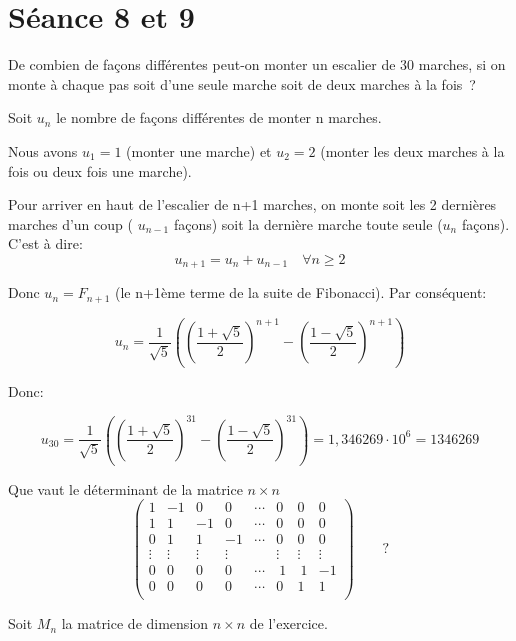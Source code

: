 \section{Séance 8 et 9}

\begin{exo}
De combien de fa\c{c}ons diff\'erentes peut-on monter un escalier de 30 marches, si on monte \`a chaque pas soit d'une seule marche soit de deux marches \`a la fois~?
\end{exo}

Soit $u_n$ le nombre de façons différentes de monter n marches.

Nous avons $u_1 = 1$ (monter une marche) et $u_2 = 2$ (monter les deux marches à la fois ou deux fois une marche).

Pour arriver en haut de l'escalier de n+1 marches, on monte soit les 2 dernières marches d'un coup ( $u_{n-1}$ façons) soit la dernière marche toute seule ($u_n$ façons). C'est à dire: \[u_{n+1} = u_n + u_{n-1} \quad \forall n \geq 2 \]

Donc $u_n = F_{n+1}$ (le n+1ème terme de la suite de Fibonacci). Par conséquent: 

\[
u_n = \frac{1}{\sqrt{5}} \left( (\frac{1+\sqrt{5}}{2})^{n+1} - (\frac{1-\sqrt{5}}{2})^{n+1} \right)
\]

Donc: 

\[
u_{30} = \frac{1}{\sqrt{5}} \left( (\frac{1+\sqrt{5}}{2})^{31} - (\frac{1-\sqrt{5}}{2})^{31} \right) = 1,346269 \cdot 10^6 = 1346269
\]


\begin{exo} 
Que vaut le d\'eterminant de la matrice $n \times n$ 
\[
\left( 
\begin{array}{rrrrrrrr}
1 &-1 &0  &0  &\cdots &0 &0 &0\\
1 & 1 &-1 &0  &\cdots &0 &0 &0\\
0 & 1 &1  &-1 &\cdots &0 &0 &0\\
\vdots & \vdots & \vdots & \vdots && \vdots & \vdots &\vdots\\
0 & 0 & 0 & 0 & \cdots & ~1 &~1 &-1\\
0 & 0 & 0 & 0 & \cdots & 0 &1 &1\\
\end{array}
\right) \qquad ?
\]
\end{exo}

Soit $M_n$ la matrice de dimension $n\times n$ de l'exercice.

